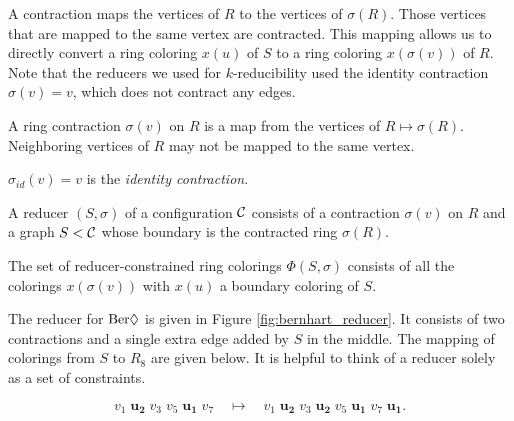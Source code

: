 A contraction maps the vertices of $R$ to the vertices of $\sigma(R)$. Those vertices that are mapped to the same vertex are contracted. This mapping allows us to directly convert a ring coloring $x(u)$ of $S$ to a ring coloring $x(\sigma(v))$ of $R$. Note that the reducers we used for $k$-reducibility used the identity contraction $\sigma(v) = v$, which does not contract any edges.

\begin{definition}
    A ring contraction $\sigma(v)$ on $R$ is a map from the vertices of $R \mapsto \sigma(R)$. Neighboring vertices of $R$ may not be mapped to the same vertex.
\end{definition}

\begin{definition}
    $\sigma_{id}(v) = v$ is the \emph{identity contraction}.
\end{definition}

\begin{definition}
    A reducer $(S,\sigma)$ of a configuration $\mathcal{C}$ consists of a contraction $\sigma(v)$ on $R$ and a graph $S < \mathcal{C}$ whose boundary is the contracted ring $\sigma(R)$.
\end{definition}

\begin{definition}
    The set of reducer-constrained ring colorings $\Phi(S, \sigma)$ consists of all the colorings $x(\sigma(v))$ with $x(u)$ a boundary coloring of $S$.
\end{definition}


The reducer for $\text{Ber}\Diamond$ is given in Figure \ref{fig:bernhart_reducer}. It consists of two contractions and a single extra edge added by $S$ in the middle. The mapping of colorings from $S$ to $R_8$ are given below. It is helpful to think of a reducer solely as a set of constraints.

\begin{equation}
    v_1\;\textbf{u}_\textbf{2}\;v_3\;v_5\;\textbf{u}_\textbf{1}\;v_7 \quad\mapsto \quad v_1\;\textbf{u}_\textbf{2}\;v_3\;\textbf{u}_\textbf{2}\;v_5\;\textbf{u}_\textbf{1}\;v_7\;\textbf{u}_\textbf{1}.
\end{equation}


